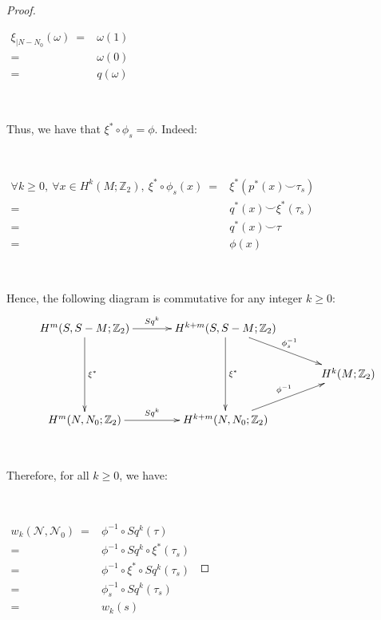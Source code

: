 \documentclass[12pt,oneside]{book}
\newcommand{\Z}{\mathbb{Z}}
\begin{document}
\begin{proof}
        \

        $\begin{array}{rl}
        	\xi_{|N - N_{0}}(\omega) \ = & \omega(1) \\
        							 = & \omega(0) \\
        							 = & q(\omega)
        \end{array}$

        \

        Thus, we have that $\xi^{*} \circ \phi_{s} = \phi$. Indeed:

        \

        $\begin{array}{rl}
        	\forall k \geq 0, \ \forall x \in H^{k}(M; \Z_{2}), \ \xi^{*} \circ \phi_{s}(x) \ = & \xi^{*}\left( p^{*}(x) \smile \tau_{s} \right) \\
        	 = & q^{*}(x) \smile \xi^{*}(\tau_{s}) \\
        	 = & q^{*}(x) \smile \tau \\
        	 = & \phi(x)
        \end{array}$

        \

        Hence, the following diagram is commutative for any integer $k \geq 0$:
        $$ \xymatrix @C=0.5cm {
        	H^{m}(S, S - M; \Z_{2}) \ar[dd]^-{\xi^{*}} \ar[rr]^-{Sq^{k}} && H^{k+m}(S, S - M; \Z_{2}) \ar[dd]^-{\xi^{*}} \ar[rrd]^-{\phi_{s}^{-1}} && \\
        	&& && H^{k}(M; \Z_{2}) \\
        	H^{m}(N, N_{0}; \Z_{2}) \ar[rr]^-{Sq^{k}} && H^{k+m}(N, N_{0}; \Z_{2}) \ar[rru]^-{\phi^{-1}} &&
        } $$

        \

        Therefore, for all $k \geq 0$, we have:

        \

        $ \begin{array}{rl}
        	w_{k}(\mathcal{N}, \mathcal{N}_{0}) \ = & \phi^{-1} \circ Sq^{k}(\tau) \\
        	= & \phi^{-1} \circ Sq^{k} \circ \xi^{*}(\tau_{s}) \\
        	= & \phi^{-1} \circ \xi^{*} \circ Sq^{k}(\tau_{s}) \\
        	= & \phi_{s}^{-1} \circ Sq^{k}(\tau_{s}) \\
        	= & w_{k}(s)
        \end{array} $

    \end{proof}
\end{document}
